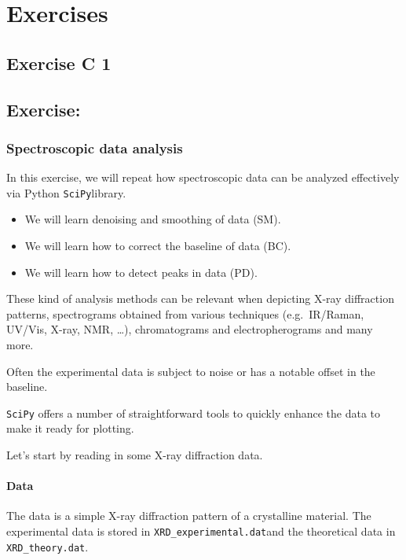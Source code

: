 \documentclass[
  letterpaper,
  DIV=11,
  numbers=noendperiod]{scrreprt}
\providecommand{\tightlist}{%
  \setlength{\itemsep}{0pt}\setlength{\parskip}{0pt}}\usepackage{longtable,booktabs,array}
\begin{document}
\part{Exercises}

\chapter{Exercise C 1}\label{exercise-c-1}

\chapter{Exercise:}\label{exercise-6}

\section{Spectroscopic data analysis}\label{spectroscopic-data-analysis}

In this exercise, we will repeat how spectroscopic data can be analyzed
effectively via Python \texttt{SciPy}library.

\begin{itemize}
\tightlist
\item
  We will learn denoising and smoothing of data (SM).
\item
  We will learn how to correct the baseline of data (BC).
\item
  We will learn how to detect peaks in data (PD).
\end{itemize}

These kind of analysis methods can be relevant when depicting X-ray
diffraction patterns, spectrograms obtained from various techniques
(e.g.~IR/Raman, UV/Vis, X-ray, NMR, \ldots), chromatograms and
electropherograms and many more.

Often the experimental data is subject to noise or has a notable offset
in the baseline.

\texttt{SciPy} offers a number of straightforward tools to quickly
enhance the data to make it ready for plotting.

Let's start by reading in some X-ray diffraction data.

\subsection{Data}\label{data-5}

The data is a simple X-ray diffraction pattern of a crystalline
material. The experimental data is stored in
\texttt{XRD\_experimental.dat}and the theoretical data in
\texttt{XRD\_theory.dat}.
\end{document}
